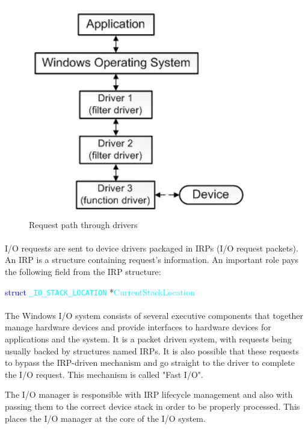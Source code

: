 		
		\begin{figure}[h!]
			\begin{center}
				\includegraphics{images/Drivers.jpg}
				\caption{Request path through drivers\cite{MSDNWhatIsADriver}}
				\label{fig:drivers}
			\end{center}
		\end{figure}
		\paragraph{}
		I/O requests are sent to device drivers packaged in IRPs (I/O request packets). An IRP is a structure containing request's information. An important role pays the following field from the IRP structure\cite{MSDNIORequests}:
		\bigskip
		
			\centerline{\textcolor{blue}{struct} \textcolor{cyan}{\texttt{\_IO\_STACK\_LOCATION}} *\textcolor{cyan}{CurrentStackLocation}}
		
		\bigskip	
		\paragraph{}
		The Windows I/O system consists of several executive components that together manage hardware devices and provide interfaces to hardware devices for applications and the system\cite{WindowsInternals}. It is a packet driven system, with requests being usually backed by structures named IRPs. It is also possible that these requests to bypass the IRP-driven mechanism and go straight to the driver to complete the I/O request. This mechanism is called "Fast I/O".
		
		The I/O manager is responsible with IRP lifecycle management and also with passing them to the correct device stack in order to be properly processed. This places the I/O manager at the core of the I/O system. 
		
